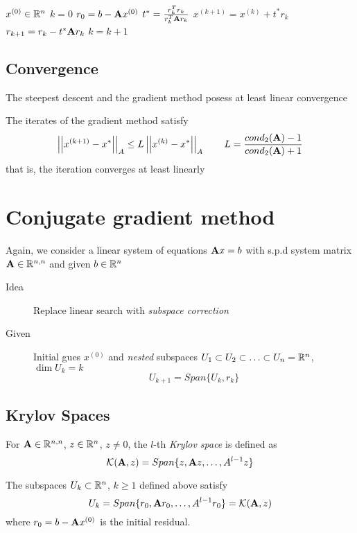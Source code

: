 		\begin{algorithmic}
		 \STATE $x^{(0)} \in \mathbb{R}^n$
		 \STATE $k = 0$
		 \STATE $r_0 =  b - \mathbf{A} x^{(0)}$
			\STATE $t^* = \frac{r_k^Tr_k}{r_k^T \mathbf{A} r_k}$
			\STATE $x^{(k+1)} = x^{(k)} + t^* r_k$
			\STATE $r_{k+1} = r_k - t^* \mathbf{A} r_k$
			\STATE $k = k+1$
		 \ENDWHILE
		\end{algorithmic}
	\subsection{Convergence}
		The steepest descent and the gradient method posess at least linear convergence
		\begin{theorem}
		 The iterates of the gradient method satisfy
		 \[
		  \left|\left| x^{(k+1)}-x^* \right|\right|_A \leq L \left|\left| x^{(k)}-x^* \right|\right|_A \qquad L = \frac{cond_2(\mathbf{A})-1}{cond_2(\mathbf{A})+1}
		 \]
		 that is, the iteration converges at least linearly
		\end{theorem}
\section{Conjugate gradient method}
	Again, we consider a linear system of equations $\mathbf{A} x = b$ with s.p.d system matrix $\mathbf{A} \in \mathbb{R}^{n,n}$  and given $b \in \mathbb{R}^n$ 
	\begin{description}
	 \item[Idea] Replace linear search with \emph{subspace correction}
	 \item[Given] Initial gues $x^{(0)}$ and \emph{nested} subspaces $U_1 \subset U_2 \subset \ldots \subset U_n = \mathbb{R}^n$, $\dim U_k = k$
	 \[
	  U_{k+1} = Span\{U_k,r_k\}
	 \]
	\end{description}

	\subsection{Krylov Spaces}
		\begin{definition}
		 For $\mathbf{A} \in \mathbb{R}^{n,n}$, $z \in \mathbb{R}^n$, $z \neq 0$, the $l$-th \emph{Krylov space} is defined as
		 \[
		  \mathcal K(\mathbf{A},z) = Span \{z, \mathbf{A}z, \ldots, A^{l-1}z\}
		 \]
		\end{definition}
		
		\begin{lemma}
		 The subspaces $U_k \subset \mathbb{R}^n$, $k \geq 1$ defined above satisfy
		 \[
		  U_k = Span \{r_0, \mathbf{A}r_0, \ldots, A^{l-1}r_0\} = \mathcal K(\mathbf{A},z) 
		 \]
		 where $r_0 = b - \mathbf{A} x^{(0)}$ is the initial residual.
		\end{lemma}
